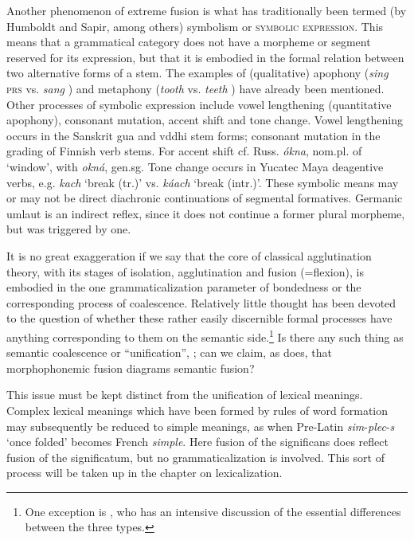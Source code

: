 Another phenomenon of extreme fusion is what has traditionally been termed (by Humboldt and Sapir, among others) symbolism or \textsc{symbolic expression}. This means that a grammatical category does not have a morpheme or segment reserved for its expression, but that it is embodied in the formal relation between two alternative forms of a stem. The examples of (qualitative) apophony (\textit{sing} \textsc{prs} vs. \textit{sang} \past) and metaphony (\textit{tooth} \glsg vs. \textit{teeth} \glpl) have already been mentioned. Other processes of symbolic expression include vowel lengthening (quantitative apophony), consonant mutation, accent shift and tone change. Vowel lengthening occurs in the Sanskrit gua and vddhi stem forms; consonant mutation in the grading of Finnish verb stems. For accent shift cf. Russ. \textit{ókna}, nom.pl. of ‘window’, with \textit{okná}, gen.sg. Tone change occurs in Yucatec Maya deagentive verbs, e.g. \textit{kach} ‘break (tr.)’ vs. \textit{káach} ‘break (intr.)’. These symbolic means may or may not be direct diachronic continuations of segmental formatives. Germanic umlaut is an indirect reflex, since it does not continue a former plural morpheme, but was triggered by one.

It is no great exaggeration if we say that the core of classical agglutination theory, with its stages of isolation, agglutination and fusion (=flexion), is embodied in the one grammaticalization parameter of bondedness or the corresponding process of coalescence. Relatively little thought has been devoted to the question of whether these rather easily discernible formal processes have anything corresponding to them on the semantic side.\footnote{One exception is \citet[488--500]{Humboldt1836}, who has an  intensive discussion of the essential differences between the three types.} Is there any such thing as semantic coalescence or “unification”, \citep[§3]{Žirmunskij1966}; can we claim, as \citet[§3]{Bybee1981} does, that morphophonemic fusion diagrams semantic fusion?

This issue must be kept distinct from the unification of lexical meanings. Complex lexical meanings which have been formed by rules of word formation may subsequently be reduced to simple meanings, as when Pre-Latin \textit{sim}{}-\textit{plec}{}-\textit{s} ‘once folded’ becomes French \textit{simple}. Here fusion of the significans does reflect fusion of the significatum, but no grammaticalization is involved. This sort of process will be taken up in the chapter on lexicalization.

